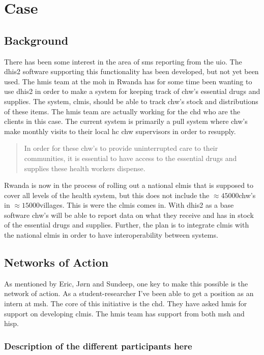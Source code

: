 \chapter{Case}
\section{Background}
There has been some interest in the area of \gls{sms} reporting from the \gls{uio}.
The \gls{dhis2} software supporting this functionality has been developed, but not yet been used.
The \gls{hmis} team at the \gls{moh} in Rwanda has for some time been wanting to use \gls{dhis2} in order to make a system for keeping track of \gls{chw}'s essential drugs and supplies. The system, \gls{clmis}, should be able to track \gls{chw}'s stock and distributions of these items. 
The \gls{hmis} team are actually working for the \gls{chd} who are the clients in this case. 
The current system is primarily a pull system where \gls{chw}'s make monthly visits to their local \gls{hc} \gls{chw} supervisors in order to resupply. 
\begin{quotation}
In order for these \gls{chw}'s to provide uninterrupted care to their communities, it is essential to have access to the essential drugs and supplies these health workers dispense.
\end{quotation}

Rwanda is now in the process of rolling out a national \gls{elmis} that is supposed to cover all levels of the health system, but this does not include the $\approx 45000$\gls{chw}'s in $\approx 15000$villages.
This is were the \gls{clmis} comes in. 
With \gls{dhis2} as a base software \gls{chw}'s will be able to report data on what they receive and has in stock of the essential drugs and supplies. 
Further, the plan is to integrate \gls{clmis} with the national \gls{elmis} in order to have interoperability between systems. 

\section{Networks of Action}
As mentioned by Eric, Jørn and Sundeep, one key to make this possible is the network of action. 
As a student-researcher I've been able to get a position as an intern at \gls{msh}.  
The core of this initiative is the \gls{chd}. They have asked \gls{hmis} for support on developing \gls{clmis}. 
The \gls{hmis} team has support from both \gls{msh} and \gls{hisp}. 
\subsection{Description of the different participants here}

